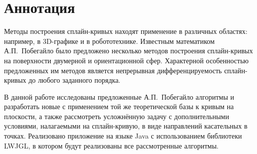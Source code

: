 \chapter*{Аннотация}

Методы построения сплайн-кривых находят применение в различных областях: например, в 3D-графике и в робототехнике.
Известным математиком А.П.~Побегайло было предложено несколько методов построения сплайн-кривых на поверхности
двумерной и ориентационной сфер. Характерной особенностью предложенных им методов является непрерывная
дифференцируемость сплайн-кривых до любого заданного порядка.

В данной работе исследованы предложенные А.П.~Побегайло алгоритмы и разработать новые с применением той же
теоретической базы к кривым на плоскости, а также рассмотреть усложнённую задачу с дополнительными условиями,
налагаемыми на сплайн-кривую, в виде направлений касательных в точках. Реализовано приложение на языке
Java с использованием библиотеки LWJGL, в котором будут реализованы все рассмотренные алгоритмы.
